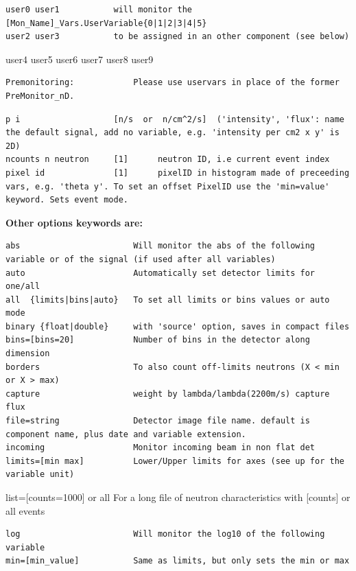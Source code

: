 \begin{verbatim}
user0 user1           will monitor the [Mon_Name]_Vars.UserVariable{0|1|2|3|4|5}
user2 user3           to be assigned in an other component (see below)
\end{verbatim}

user4 user5 user6 user7 user8 user9

\begin{verbatim}
Premonitoring:            Please use uservars in place of the former PreMonitor_nD.
\end{verbatim}

\begin{verbatim}
p i                   [n/s  or  n/cm^2/s]  ('intensity', 'flux': name the default signal, add no variable, e.g. 'intensity per cm2 x y' is 2D)
ncounts n neutron     [1]      neutron ID, i.e current event index
pixel id              [1]      pixelID in histogram made of preceeding vars, e.g. 'theta y'. To set an offset PixelID use the 'min=value' keyword. Sets event mode.
\end{verbatim}

\textbf{Other options keywords are:}

\begin{verbatim}
abs                       Will monitor the abs of the following variable or of the signal (if used after all variables)
auto                      Automatically set detector limits for one/all
all  {limits|bins|auto}   To set all limits or bins values or auto mode
binary {float|double}     with 'source' option, saves in compact files
bins=[bins=20]            Number of bins in the detector along dimension
borders                   To also count off-limits neutrons (X < min or X > max)
capture                   weight by lambda/lambda(2200m/s) capture flux
file=string               Detector image file name. default is component name, plus date and variable extension.
incoming                  Monitor incoming beam in non flat det
limits=[min max]          Lower/Upper limits for axes (see up for the variable unit)
\end{verbatim}

list=[counts=1000] or all For a long file of neutron characteristics with [counts] or all events

\begin{verbatim}
log                       Will monitor the log10 of the following variable
min=[min_value]           Same as limits, but only sets the min or max
\end{verbatim}

